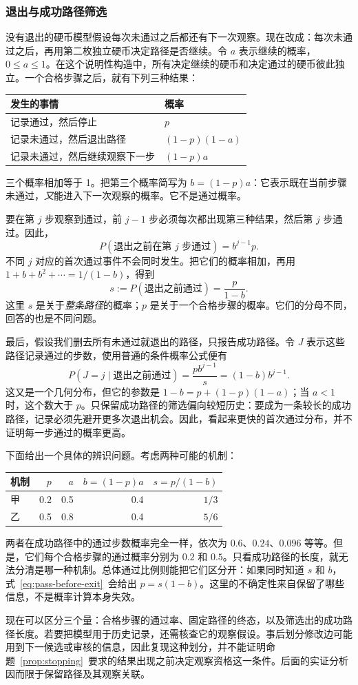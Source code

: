\subsubsection{退出与成功路径筛选}
没有退出的硬币模型假设每次未通过之后都还有下一次观察。现在改成：每次未通过之后，再用第二枚独立硬币决定路径是否继续。令 $a$ 表示继续的概率，$0\le a\le1$。在这个说明性构造中，所有决定继续的硬币和决定通过的硬币彼此独立。一个合格步骤之后，就有下列三种结果：
\begin{center}
\begin{tabularx}{\linewidth}{Yl}
\toprule
发生的事情 & 概率 \\
\midrule
记录通过，然后停止 & $p$ \\
记录未通过，然后退出路径 & $(1-p)(1-a)$ \\
记录未通过，然后继续观察下一步 & $(1-p)a$ \\
\bottomrule
\end{tabularx}
\end{center}
三个概率相加等于 1。把第三个概率简写为 $b=(1-p)a$：它表示既在当前步骤未通过，\emph{又}能进入下一次观察的概率。它不是通过概率。

要在第 $j$ 步观察到通过，前 $j-1$ 步必须每次都出现第三种结果，然后第 $j$ 步通过。因此，
\[
 P(\text{退出之前在第 }j\text{ 步通过})=b^{j-1}p.
\]
不同 $j$ 对应的首次通过事件不会同时发生。把它们的概率相加，再用 $1+b+b^2+\cdots=1/(1-b)$，得到
\begin{equation}
 s:=P(\text{退出之前通过})=\frac{p}{1-b}.
 \label{eq:pass-before-exit}
\end{equation}
这里 $s$ 是关于\emph{整条路径}的概率；$p$ 是关于一个合格步骤的概率。它们的分母不同，回答的也是不同问题。

最后，假设我们删去所有未通过就退出的路径，只报告成功路径。令 $J$ 表示这些路径记录通过的步数，使用普通的条件概率公式便有
\begin{equation}
 P(J=j\mid\text{退出之前通过})
 =\frac{p b^{j-1}}{s}=(1-b)b^{j-1}.
 \label{eq:selected-success-time}
\end{equation}
这又是一个几何分布，但它的参数是 $1-b=p+(1-p)(1-a)$；当 $a<1$ 时，这个数大于 $p$。只保留成功路径的筛选偏向较短历史：要成为一条较长的成功路径，记录必须先避开更多次退出机会。因此，看起来更快的首次通过分布，并不证明每一步通过的概率更高。

下面给出一个具体的辨识问题。考虑两种可能的机制：
\begin{center}
\begin{tabular}{lrrrr}
\toprule
机制 & $p$ & $a$ & $b=(1-p)a$ & $s=p/(1-b)$ \\
\midrule
甲 & 0.2 & 0.5 & 0.4 & $1/3$ \\
乙 & 0.5 & 0.8 & 0.4 & $5/6$ \\
\bottomrule
\end{tabular}
\end{center}
两者在成功路径中的通过步数概率完全一样，依次为 $0.6$、$0.24$、$0.096$ 等等。但是，它们每个合格步骤的通过概率分别为 $0.2$ 和 $0.5$。只看成功路径的长度，就无法分清是哪一种机制。总体通过比例则能把它们区分开：如果同时知道 $s$ 和 $b$，式~\eqref{eq:pass-before-exit}~会给出 $p=s(1-b)$。这里的不确定性来自保留了哪些信息，不是概率计算本身失效。

现在可以区分三个量：合格步骤的通过率、固定路径的终态，以及筛选出的成功路径长度。若要把模型用于历史记录，还需核查它的观察假设。事后划分修改边可能用到下一候选或审核的信息，因此复现这种划分，并不能证明命题~\ref{prop:stopping}~要求的结果出现之前决定观察资格这一条件。后面的实证分析因而限于保留路径及其观察关联。
